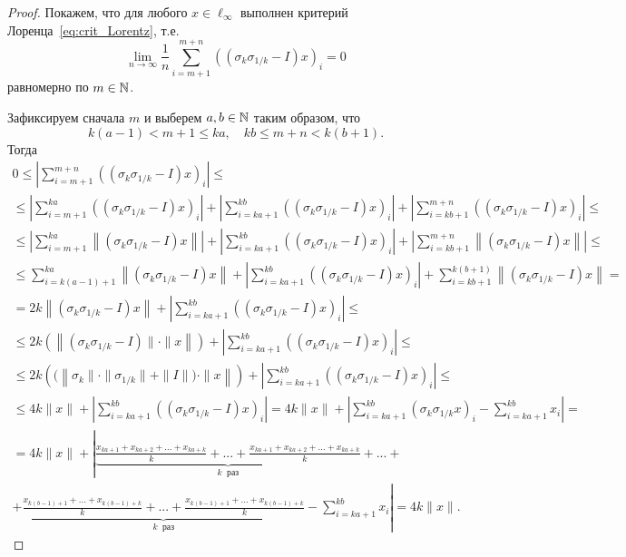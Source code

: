 \begin{proof}
	Покажем, что для любого $x\in\ell_\infty$ выполнен критерий Лоренца~\eqref{eq:crit_Lorentz},
	т.е.
	\begin{equation}
		\label{eq:Lorentz_sigma_1_k_I}
		\lim_{n\to\infty} \frac{1}{n} \sum_{i=m+1}^{m+n} ((\sigma_k \sigma_{1/k} - I)x)_i = 0
	\end{equation}
	равномерно по $m\in\mathbb{N}$.

	Зафиксируем сначала $m$ и выберем $a,b\in\mathbb{N}$
	таким образом, что
	\begin{equation}
		k(a-1) <    m+1 \leq ka
		,
		\quad
		kb     \leq m+n <    k(b+1)
		.
	\end{equation}
	Тогда
	\begin{multline}
		0 \leq \left|
		\sum_{i=m     +1}^{m+n} \left( (\sigma_k \sigma_{1/k} - I)x \right)_i
		\right|
		\leq
		\\\leq
		\left|\sum_{i=m     +1}^{ka    } \left( (\sigma_k \sigma_{1/k} - I)x \right)_i\right| +
		\left|\sum_{i=ka    +1}^{kb    } \left( (\sigma_k \sigma_{1/k} - I)x \right)_i\right| +
		\left|\sum_{i=kb    +1}^{m+n   } \left( (\sigma_k \sigma_{1/k} - I)x \right)_i\right|
		\leq
		\\\leq
		\left|\sum_{i=m     +1}^{ka    } \left\| (\sigma_k \sigma_{1/k} - I)x \right\|\right| +
		\left|\sum_{i=ka    +1}^{kb    } \left( (\sigma_k \sigma_{1/k} - I)x \right)_i\right| +
		\left|\sum_{i=kb    +1}^{m+n   } \left\| (\sigma_k \sigma_{1/k} - I)x \right\|\right|
		\leq
		\\\leq
		      \sum_{i=k(a-1)+1}^{ka    } \left\| (\sigma_k \sigma_{1/k} - I)x \right\| +
		\left|\sum_{i=ka    +1}^{kb    } \left( (\sigma_k \sigma_{1/k} - I)x \right)_i\right| +
		      \sum_{i=kb    +1}^{k(b+1)} \left\| (\sigma_k \sigma_{1/k} - I)x \right\|
		=
		\\=
		2k \left\| (\sigma_k \sigma_{1/k} - I)x \right\| +
		\left|\sum_{i=ka    +1}^{kb    } \left( (\sigma_k \sigma_{1/k} - I)x \right)_i\right|
		\leq
		\\\leq
		2k \left(\left\| (\sigma_k \sigma_{1/k} - I)\| \cdot \|x \right\|\right) +
		\left|\sum_{i=ka    +1}^{kb    } \left( (\sigma_k \sigma_{1/k} - I)x \right)_i\right|
		\leq
		\\\leq
		2k \left( (\left\|\sigma_k\| \cdot \| \sigma_{1/k}\| + \|I\|) \cdot \|x \right\|\right) +
		\left|\sum_{i=ka    +1}^{kb    } \left( (\sigma_k \sigma_{1/k} - I)x \right)_i\right|
		\leq
		\\\leq
		4k  \|x \| +
		\left|\sum_{i=ka    +1}^{kb    } \left( (\sigma_k \sigma_{1/k} - I)x \right)_i\right|
		=
		4k  \|x \| +
		\left|\sum_{i=ka    +1}^{kb    } (\sigma_k \sigma_{1/k}x)_i - \sum_{i=ka    +1}^{kb    } x_i\right|
		=
		\\=
		4k  \|x \| +
		\left|
			\underbrace{\frac{x_{ka+1} + x_{ka+2} + ... + x_{ka+k}}{k} + ... + \frac{x_{ka+1} + x_{ka+2} + ... + x_{ka+k}}{k}}_{k~\text{~раз}}
			+
			...+
		\right.
		\\
		\left.
			+
			\underbrace{\frac{x_{k(b-1)+1}  + ... + x_{k(b-1)+k}}{k} + ... + \frac{x_{k(b-1)+1} + ... + x_{k(b-1)+k}}{k}}_{k~\text{~раз}}
			-\sum_{i=ka    +1}^{kb    } x_i
		\right|
		=
		4k\|x\|
		.
	\end{multline}


\end{proof}
